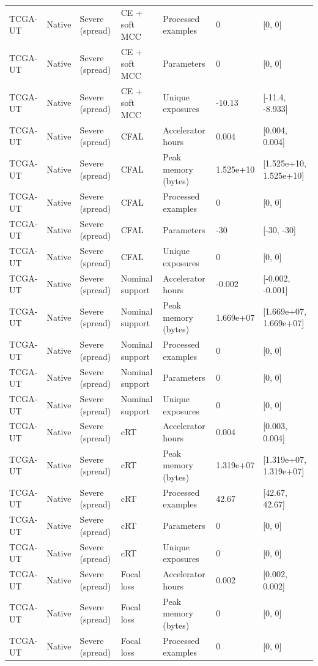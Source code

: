 \begin{longtable}{lllllll}
TCGA-UT & Native & Severe (spread) & CE + soft MCC & Processed examples & 0 & [0, 0] \\
TCGA-UT & Native & Severe (spread) & CE + soft MCC & Parameters & 0 & [0, 0] \\
TCGA-UT & Native & Severe (spread) & CE + soft MCC & Unique exposures & -10.13 & [-11.4, -8.933] \\
TCGA-UT & Native & Severe (spread) & CFAL & Accelerator hours & 0.004 & [0.004, 0.004] \\
TCGA-UT & Native & Severe (spread) & CFAL & Peak memory (bytes) & 1.525e+10 & [1.525e+10, 1.525e+10] \\
TCGA-UT & Native & Severe (spread) & CFAL & Processed examples & 0 & [0, 0] \\
TCGA-UT & Native & Severe (spread) & CFAL & Parameters & -30 & [-30, -30] \\
TCGA-UT & Native & Severe (spread) & CFAL & Unique exposures & 0 & [0, 0] \\
TCGA-UT & Native & Severe (spread) & Nominal support & Accelerator hours & -0.002 & [-0.002, -0.001] \\
TCGA-UT & Native & Severe (spread) & Nominal support & Peak memory (bytes) & 1.669e+07 & [1.669e+07, 1.669e+07] \\
TCGA-UT & Native & Severe (spread) & Nominal support & Processed examples & 0 & [0, 0] \\
TCGA-UT & Native & Severe (spread) & Nominal support & Parameters & 0 & [0, 0] \\
TCGA-UT & Native & Severe (spread) & Nominal support & Unique exposures & 0 & [0, 0] \\
TCGA-UT & Native & Severe (spread) & cRT & Accelerator hours & 0.004 & [0.003, 0.004] \\
TCGA-UT & Native & Severe (spread) & cRT & Peak memory (bytes) & 1.319e+07 & [1.319e+07, 1.319e+07] \\
TCGA-UT & Native & Severe (spread) & cRT & Processed examples & 42.67 & [42.67, 42.67] \\
TCGA-UT & Native & Severe (spread) & cRT & Parameters & 0 & [0, 0] \\
TCGA-UT & Native & Severe (spread) & cRT & Unique exposures & 0 & [0, 0] \\
TCGA-UT & Native & Severe (spread) & Focal loss & Accelerator hours & 0.002 & [0.002, 0.002] \\
TCGA-UT & Native & Severe (spread) & Focal loss & Peak memory (bytes) & 0 & [0, 0] \\
TCGA-UT & Native & Severe (spread) & Focal loss & Processed examples & 0 & [0, 0] \\

\end{longtable}
